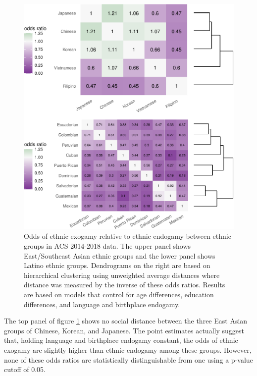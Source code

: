 \documentclass[11pt,]{article}
\begin{document}
\begin{figure}
\centering
\includegraphics{main_files/figure-latex/ethnic-heat-map-1.pdf}
\caption{\label{fig:ethnic-heat-map}Odds of ethnic exogamy relative to ethnic endogamy between ethnic groups in ACS 2014-2018 data. The upper panel shows East/Southeast Asian ethnic groups and the lower panel shows Latino ethnic groups. Dendrograms on the right are based on hierarchical clustering using unweighted average distances where distance was measured by the inverse of these odds ratios. Results are based on models that control for age differences, education differences, and language and birthplace endogamy.}
\end{figure}

The top panel of figure \ref{fig:ethnic-heat-map} shows no social distance between the three East Asian groups of Chinese, Korean, and Japanese. The point estimates actually suggest that, holding language and birthplace endogamy constant, the odds of ethnic exogamy are slightly higher than ethnic endogamy among these groups. However, none of these odds ratios are statistically distinguishable from one using a p-value cutoff of 0.05.
\end{document}

